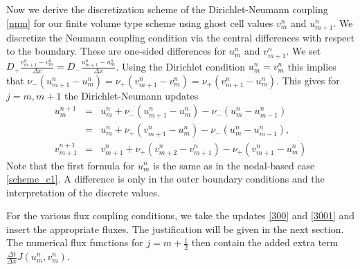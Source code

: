 Now we derive the discretization scheme of the Dirichlet-Neumann coupling \eqref{nnm} for our finite volume type scheme using
ghost cell values $v^n_m$ and $u^n_{m+1}$.
We discretize the Neumann coupling condition via the central 
differences with respect to the boundary. These are one-sided differences for $u_m^n$ and $v_{m+1}^n$. We set
$D_{+}\frac{v^n_{m+1}-v^n_{m}}{\Delta x}=D_{-}\frac{u^n_{m+1}-u^n_m}{\Delta x}$.
Using the Dirichlet condition $u^n_m=v^n_m$  
this implies that $\nu_{-}(u^n_{m+1}-u^n_m)=\nu_{+}(v^n_{m+1}-v^n_m)=\nu_{+}(v^n_{m+1}-u^n_m)$. 
This gives for $j=m, m+1$ the Dirichlet-Neumann updates
%
\begin{eqnarray*}
u^{n+1}_{m}&=&u^n_m+\nu_{-}(u^n_{m+1}-u^n_m)-\nu_{-}(u^n_m-u^n_{m-1})\\ 
&=&u^n_m+\nu_+(v^n_{m+1}-u^n_m)-\nu_-(u^n_m-u^n_{m-1}),\\
v^{n+1}_{m+1}&=&v_{m+1}^n+\nu_+ (v^n_{m+2}-v_{m+1}^{n}) - \nu_+ (v_{m+1}^n-u_m^{n} )
\end{eqnarray*}
%
Note that the first formula for $u_m^n$ is the same as in the nodal-based case \eqref{scheme_c1}. 
A difference is only in the outer boundary conditions and the interpretation of the discrete values.

For the various flux coupling conditions, we take the updates \eqref{300} and \eqref{3001} and insert the appropriate fluxes.
The justification will be given in the next section. The numerical flux functions for $j=m+\frac 12$ 
then contain the added extra term $\frac {\Delta t}{\Delta x}J(u_m^n,v_m^n)$.